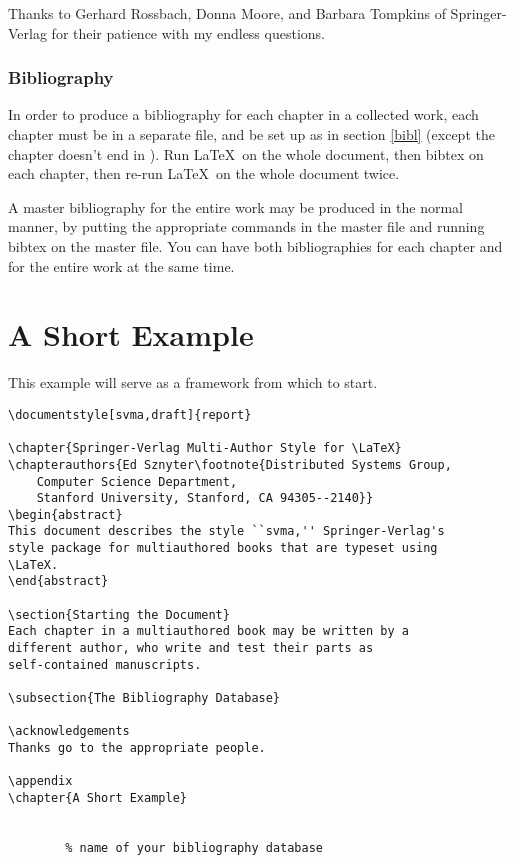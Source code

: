 \acknowledgements
Thanks to Gerhard Rossbach, Donna Moore, and Barbara Tompkins of
Springer-Verlag for their patience with my endless questions.

\subsection{Bibliography}
In order to produce a bibliography for each chapter in a collected work,
each chapter must be in a separate file, and be set up as in
section \ref{bibl} (except the chapter doesn't end in \verb||).
Run \LaTeX\ on the whole document, then bibtex on each chapter, then
re-run \LaTeX\ on the whole document twice.

A master bibliography for the entire work may be produced in the normal
manner, by putting the appropriate commands in the master file and
running bibtex on the master file.  You can have both bibliographies
for each chapter and for the entire work at the same time.

\appendix
\chapter{A Short Example}

This example will serve as a framework from which to start.

\begin{verbatim}
\documentstyle[svma,draft]{report}

\chapter{Springer-Verlag Multi-Author Style for \LaTeX}
\chapterauthors{Ed Sznyter\footnote{Distributed Systems Group,
	Computer Science Department,
	Stanford University, Stanford, CA 94305--2140}}
\begin{abstract}
This document describes the style ``svma,'' Springer-Verlag's
style package for multiauthored books that are typeset using
\LaTeX.
\end{abstract}

\section{Starting the Document}
Each chapter in a multiauthored book may be written by a
different author, who write and test their parts as
self-contained manuscripts.

\subsection{The Bibliography Database}

\acknowledgements
Thanks go to the appropriate people.

\appendix
\chapter{A Short Example}


		% name of your bibliography database


\end{verbatim}

